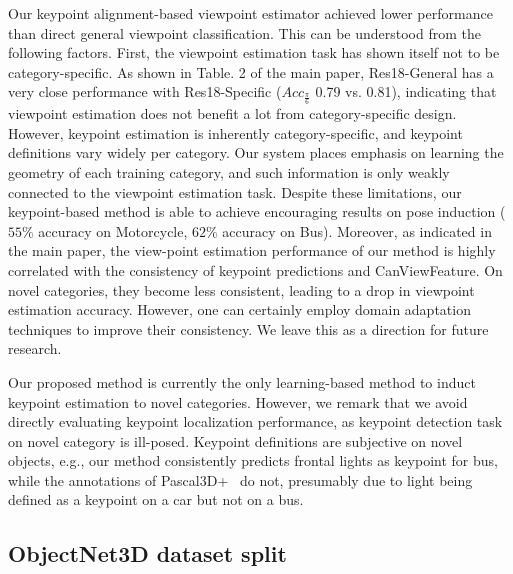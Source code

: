 \documentclass[runningheads]{llncs}
\begin{document}
Our keypoint alignment-based viewpoint estimator achieved lower performance than direct general viewpoint classification. This can be understood from the following factors. First, the viewpoint estimation task has shown itself not to be category-specific. As shown in Table. 2 of the main paper, Res18-General has a very close performance with Res18-Specific ($\mathit{Acc}_\frac{\pi}{6}$ 0.79 vs. 0.81), indicating that viewpoint estimation does not benefit a lot from category-specific design.
However, keypoint estimation is inherently category-specific, and keypoint definitions vary widely per category.
Our system places emphasis on learning the geometry of each training category, and such information is only weakly connected to the viewpoint estimation task.
Despite these limitations, our keypoint-based method is able to achieve encouraging results on pose induction ($55\%$ accuracy on Motorcycle, $62\%$ accuracy on Bus). Moreover, as indicated in the main paper, the view-point estimation performance of our method is highly correlated with the consistency of keypoint predictions and CanViewFeature. On novel categories, they become less consistent, leading to a drop in viewpoint estimation accuracy. However, one can certainly employ domain adaptation techniques to improve their consistency. We leave this as a direction for future research.

Our proposed method is currently the only learning-based method to induct keypoint estimation to novel categories. However, we remark that we avoid directly evaluating keypoint localization performance, as keypoint detection task on novel category is ill-posed. Keypoint definitions are subjective on novel objects, e.g., our method consistently predicts frontal lights as keypoint for bus, while the annotations of Pascal3D+~\cite{xiang2014beyond} do not, presumably due to light being defined as a keypoint on a car but not on a bus.




\subsection{ObjectNet3D dataset split}
\end{document}
